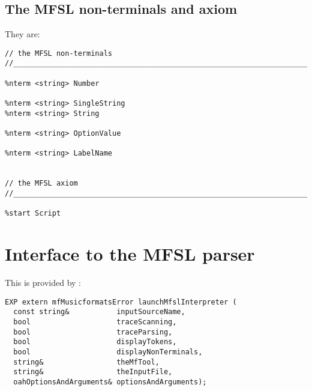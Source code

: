 \subsection{The MFSL non-terminals and axiom}

They are:
\begin{lstlisting}[language=Bison]
// the MFSL non-terminals
//_______________________________________________________________________________

%nterm <string> Number

%nterm <string> SingleString
%nterm <string> String

%nterm <string> OptionValue

%nterm <string> LabelName


// the MFSL axiom
//_______________________________________________________________________________

%start Script
\end{lstlisting}


\section{Interface to the MFSL parser}

This is provided by :
\begin{lstlisting}[language=Terminal]
EXP extern mfMusicformatsError launchMfslInterpreter (
  const string&           inputSourceName,
  bool                    traceScanning,
  bool                    traceParsing,
  bool                    displayTokens,
  bool                    displayNonTerminals,
  string&                 theMfTool,
  string&                 theInputFile,
  oahOptionsAndArguments& optionsAndArguments);
\end{lstlisting}


